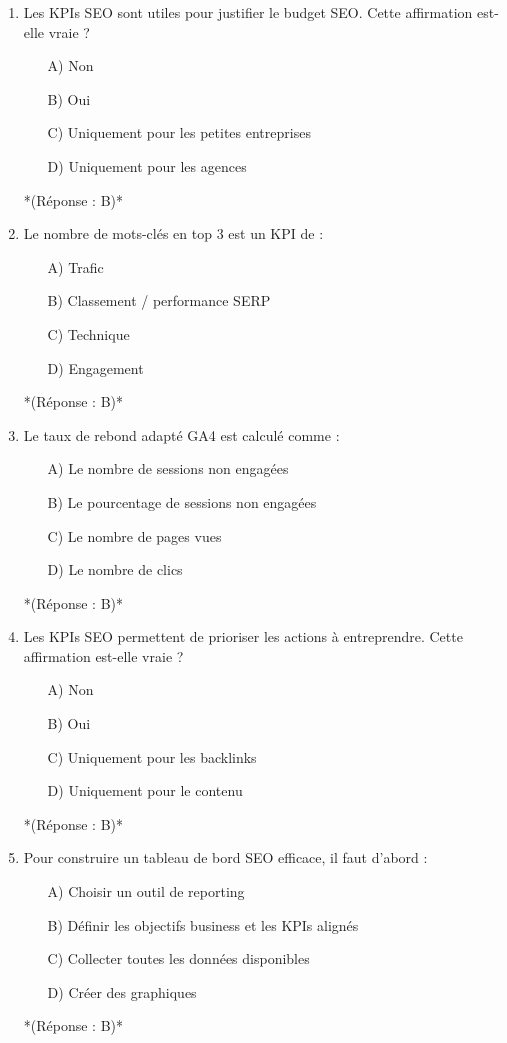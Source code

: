 \documentclass[12pt,a4paper,twoside]{report}
\begin{document}
\begin{enumerate}
    \item Les KPIs SEO sont utiles pour justifier le budget SEO. Cette affirmation est-elle vraie ?
    \begin{itemize}
        \item[A)] Non
        \item[B)] Oui
        \item[C)] Uniquement pour les petites entreprises
        \item[D)] Uniquement pour les agences
    \end{itemize}
    *(Réponse : B)*

    \item Le nombre de mots-clés en top 3 est un KPI de :
    \begin{itemize}
        \item[A)] Trafic
        \item[B)] Classement / performance SERP
        \item[C)] Technique
        \item[D)] Engagement
    \end{itemize}
    *(Réponse : B)*

    \item Le taux de rebond adapté GA4 est calculé comme :
    \begin{itemize}
        \item[A)] Le nombre de sessions non engagées
        \item[B)] Le pourcentage de sessions non engagées
        \item[C)] Le nombre de pages vues
        \item[D)] Le nombre de clics
    \end{itemize}
    *(Réponse : B)*

    \item Les KPIs SEO permettent de prioriser les actions à entreprendre. Cette affirmation est-elle vraie ?
    \begin{itemize}
        \item[A)] Non
        \item[B)] Oui
        \item[C)] Uniquement pour les backlinks
        \item[D)] Uniquement pour le contenu
    \end{itemize}
    *(Réponse : B)*

    \item Pour construire un tableau de bord SEO efficace, il faut d'abord :
    \begin{itemize}
        \item[A)] Choisir un outil de reporting
        \item[B)] Définir les objectifs business et les KPIs alignés
        \item[C)] Collecter toutes les données disponibles
        \item[D)] Créer des graphiques
    \end{itemize}
    *(Réponse : B)*
\end{enumerate}
\end{document}
